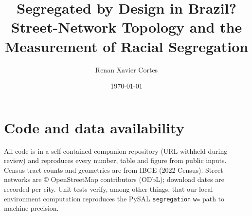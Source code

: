 \documentclass[11pt]{article}
\title{Segregated by Design in Brazil? Street-Network Topology and the Measurement of Racial Segregation}
\author{Renan Xavier Cortes}
\date{\today}
\begin{document}
\maketitle








\section*{Code and data availability}
All code is in a self-contained companion repository (URL withheld during review) and reproduces every number,
table and figure from public inputs. Census tract counts and geometries are from IBGE (2022 Census). Street
networks are \copyright{} OpenStreetMap contributors (ODbL); download dates are recorded per city. Unit tests
verify, among other things, that our local-environment computation reproduces the PySAL \texttt{segregation}
\texttt{w=} path to machine precision.



\appendix

\end{document}
